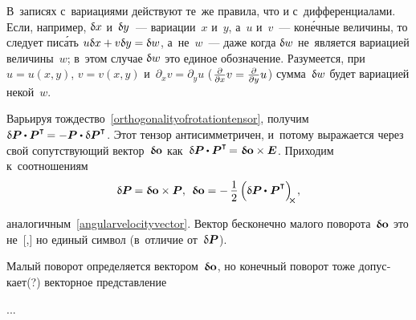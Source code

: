 \begin{otherlanguage}{russian}
{\par}



В~записях с~вариациями действуют те~же правила, что и с~дифференциалами. Если, например, ${\updelta\hspace{-0.1ex}x}$ и~${\updelta\hspace{-0.1ex}y}$~--- вариации~$x$ и~$y$, а~$u$ и~$v$~--- кон\'{е}чные величины, то следует пис\'{а}ть ${u \updelta\hspace{-0.1ex}x + v \updelta\hspace{-0.1ex}y = \updelta\hspace{-0.1ex}w}$, а~не~$w$~--- даже когда ${\updelta\hspace{-0.1ex}w}$ не~является вариацией величины~$w$; в~этом случае ${\updelta\hspace{-0.1ex}w}$ это единое обозначение. Разумеется, при~${u \!=\! u(x,y)}$, ${v \!=\! v(x,y)}$ и~${\partial_x v = \partial_y u}$ (${\hspace{0.16ex}\frac{\partial}{\partial x} v = \frac{\partial}{\partial y} u\hspace{0.16ex}}$) сумма~${\updelta\hspace{-0.1ex}w}$ будет вариацией некой~$w$.

Варьируя тождество~\eqref{orthogonalityofrotationtensor}, получим ${\variation{\bm{P}} \hspace{-0.08ex} \dotp \bm{P}^{\T} \hspace{-0.2ex} = - \bm{P} \dotp \variation{\bm{P}}^{\T}}$\!. Этот тензор антисимметричен, и~потому выражается через свой сопутствующий вектор~${\bm{\updelta}\hspace{-0.125ex}\bm{\mathrm{o}}}$ как~${\variation{\bm{P}} \hspace{-0.08ex} \dotp \bm{P}^{\T} \hspace{-0.25ex} = \hspace{0.1ex} \varvector{o} \times \bm{E}}$. Приходим к~соотношениям
\vspace{-0.4em}\begin{equation}
\variation{\bm{P}} \hspace{-0.1ex} = \varvector{o} \times \bm{P} , \:\:
\varvector{o} = - \, \displaystyle \onehalf \left( { \variation{\bm{P}} \hspace{-0.08ex} \dotp^{\mathstrut} \bm{P}^{\T} } \right)_{\hspace{-0.25em}\Xcompanion} \hspace{-0.1ex} ,
\end{equation}

\vspace{-0.5em} \noindent аналогичным~\eqref{angularvelocityvector}. Вектор бесконечно малого поворота~${\bm{\updelta}\hspace{-0.125ex}\bm{\mathrm{o}}}$ это не~[,] но единый символ (в~отличие от~${\updelta\hspace{-0.1ex}\bm{P}}$).

Малый поворот определяется вектором~${\bm{\updelta}\hspace{-0.125ex}\bm{\mathrm{o}}}$, но конечный поворот тоже допускает(?) векторное представление

...



\end{otherlanguage}

